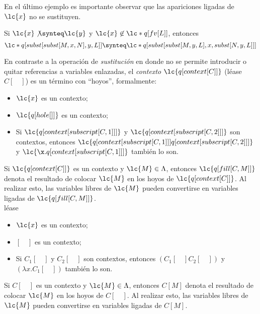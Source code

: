 En el último ejemplo es importante observar que las apariciones ligadas de
\(\lc{x}\) no se sustituyen. \\

\begin{lema}
Si \(\lc{x} \not\synteq \lc{y}\) y \(\lc{x}\not\in \lc*{q[fv[L]]}\), entonces
\[\lc*{q[subst[subst[M,x,N],y,L]]} \synteq \lc*{q[subst[subst[M,y,L],x,subst[N,y,L]]]}\]
\end{lema}

En contraste a la operación de \emph{sustitución} en donde no se permite
introducir o quitar referencias a variables enlazadas, el \emph{contexto}
\(\lc{q[context[C]]}\) (léase \(C\left[ \quad \right]\)) es un término con
``hoyos'', formalmente:\\

\begin{itemize}
\item \(\lc{x}\) es un contexto;
\item \(\lc{q[hole[]]}\) es un contexto;
\item Si \(\lc{q[context[subscript[C,1]]]}\) y
  \(\lc{q[context[subscript[C,2]]]}\) son contextos, entonces
  \(\lc{q[context[subscript[C,1]]] q[context[subscript[C,2]]]}\) y
  \(\lc{\x.q[context[subscript[C,1]]]}\) también lo son.
\end{itemize}

Si \(\lc{q[context[C]]}\) es un contexto y \(\lc{M} \in \Lambda\), entonces
\(\lc{q[fill[C,M]]}\) denota el resultado de colocar \(\lc{M}\) en los hoyos
de \(\lc{q[context[C]]}\). Al realizar esto, las variables libres de \(\lc{M}\)
pueden convertirse en variables ligadas de \(\lc{q[fill[C,M]]}\). \\

léase

\begin{itemize}
\item \(\lc{x}\) es un contexto;
\item \(\left[ \quad \right]\) es un contexto;
\item Si \(C_{1}\left[ \quad \right]\) y \(C_{2}\left[ \quad \right]\) son
  contextos, entonces \((C_{1}\left[ \quad \right] C_{2}\left[ \quad \right])\)
  y \((\lambda x.C_{1}\left[ \quad \right])\) también lo son.
\end{itemize}

Si \(C\left[ \quad \right]\) es un contexto y \(\lc{M} \in \Lambda\), entonces
\(C\left[ M \right]\) denota el resultado de colocar \(\lc{M}\) en los hoyos
de \(C\left[ \quad \right]\). Al realizar esto, las variables libres de \(\lc{M}\)
pueden convertirse en variables ligadas de \(C\left[ M \right]\). \\

